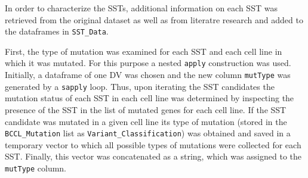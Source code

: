 \documentclass[]{article}
\newenvironment{Shaded}{\begin{snugshade}}{\end{snugshade}}
\newcommand{\CommentTok}[1]{\textcolor[rgb]{0.56,0.35,0.01}{\textit{#1}}}
\newcommand{\ControlFlowTok}[1]{\textcolor[rgb]{0.13,0.29,0.53}{\textbf{#1}}}
\newcommand{\DataTypeTok}[1]{\textcolor[rgb]{0.13,0.29,0.53}{#1}}
\newcommand{\DecValTok}[1]{\textcolor[rgb]{0.00,0.00,0.81}{#1}}
\newcommand{\KeywordTok}[1]{\textcolor[rgb]{0.13,0.29,0.53}{\textbf{#1}}}
\newcommand{\NormalTok}[1]{#1}
\newcommand{\OperatorTok}[1]{\textcolor[rgb]{0.81,0.36,0.00}{\textbf{#1}}}
\newcommand{\StringTok}[1]{\textcolor[rgb]{0.31,0.60,0.02}{#1}}
\begin{document}
In order to characterize the SSTs, additional information on each SST
was retrieved from the original dataset as well as from literatre
research and added to the dataframes in \texttt{SST\_Data}.

First, the type of mutation was examined for each SST and each cell line
in which it was mutated. For this purpose a nested \texttt{apply}
construction was used. Initially, a dataframe of one DV was chosen and
the new column \texttt{mutType} was generated by a \texttt{sapply} loop.
Thus, upon iterating the SST candidates the mutation status of each SST
in each cell line was determined by inspecting the presence of the SST
in the list of mutated genes for each cell line. If the SST candidate
was mutated in a given cell line its type of mutation (stored in the
\texttt{BCCL\_Mutation} list as \texttt{Variant\_Classification}) was
obtained and saved in a temporary vector to which all possible types of
mutations were collected for each SST. Finally, this vector was
concatenated as a string, which was assigned to the \texttt{mutType}
column.

\begin{Shaded}
\end{Shaded}
\end{document}
